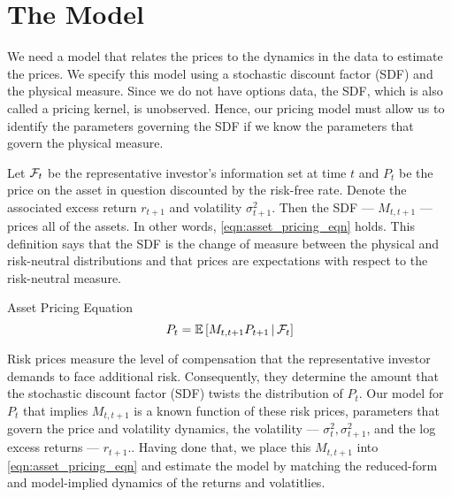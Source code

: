 \documentclass[11pt, letterpaper, twoside]{article}
\begin{document}
\section{The Model}\label{sec:model}

\addtocounter{subsection}{1}

We need a model that relates the prices to the dynamics in the data to estimate the prices. We specify this model using a stochastic discount factor (SDF) and the physical measure. Since we do not have options data, the SDF, which is also called a pricing kernel, is unobserved. Hence, our pricing model must allow us to identify the parameters governing the SDF if we know the parameters that govern the physical measure. 

Let $\mathcal{F}_t$ be the representative investor's information set at time $t$ and $P_t$ be the price on the asset in question discounted by the risk-free rate. Denote the associated excess return $r_{t+1}$ and volatility $\sigma^2_{t+1}$. Then the SDF --- $M_{t,t+1}$ --- prices all of the assets. In other words, \cref{eqn:asset_pricing_eqn} holds. This definition says that the SDF is the change of measure between the physical and risk-neutral distributions and that prices are expectations with respect to the risk-neutral measure.

\begin{defn}{Asset Pricing Equation}
  \label{eqn:asset_pricing_eqn}
  \begin{equation}
    P_t = \operatorname{\mathbb{E}}\left[M_{t,t+1} P_{t+1} \,\middle\vert\, \mathcal{F}_t \right] 
  \end{equation}
\end{defn}

Risk prices measure the level of compensation that the representative investor demands to face additional risk. Consequently, they determine the amount that the stochastic discount factor (SDF) twists the distribution of $P_t$. Our model for $P_t$ that implies $M_{t,t+1}$ is a known function of these risk prices, parameters that govern the price and volatility dynamics, the volatility --- $\sigma^2_{t}, \sigma^2_{t+1}$, and the log excess returns --- $r_{t+1}$.. Having done that, we place this $M_{t,t+1}$ into \cref{eqn:asset_pricing_eqn} and estimate the model by matching the reduced-form and model-implied dynamics of the returns and volatitlies.
\end{document}
